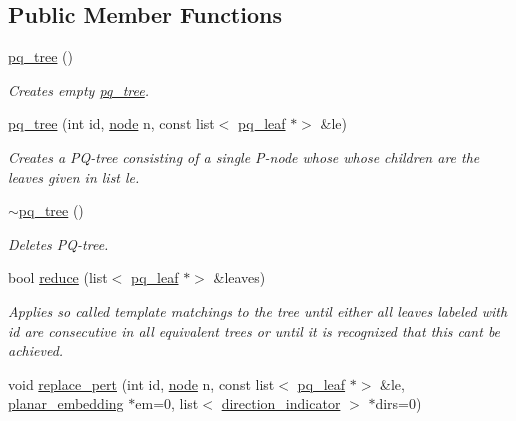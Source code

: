\subsection*{Public Member Functions}
\begin{DoxyCompactItemize}
\item 
\mbox{\label{classpq__tree_afea06921780eb07ddb36294b109964d0}} 
\mbox{\hyperlink{classpq__tree_afea06921780eb07ddb36294b109964d0}{pq\+\_\+tree}} ()
\begin{DoxyCompactList}\small\item\em Creates empty \mbox{\hyperlink{classpq__tree}{pq\+\_\+tree}}. \end{DoxyCompactList}\item 
\mbox{\hyperlink{classpq__tree_a2929a77b0e62274989884fd63db7fbe1}{pq\+\_\+tree}} (int id, \mbox{\hyperlink{classnode}{node}} n, const list$<$ \mbox{\hyperlink{classpq__leaf}{pq\+\_\+leaf}} $\ast$$>$ \&le)
\begin{DoxyCompactList}\small\item\em Creates a P\+Q-\/tree consisting of a single P-\/node whose whose children are the leaves given in list {\ttfamily le}. \end{DoxyCompactList}\item 
\mbox{\label{classpq__tree_ae6b44b3a6db8914beb368aee2bf7cc92}} 
\mbox{\hyperlink{classpq__tree_ae6b44b3a6db8914beb368aee2bf7cc92}{$\sim$pq\+\_\+tree}} ()
\begin{DoxyCompactList}\small\item\em Deletes P\+Q-\/tree. \end{DoxyCompactList}\item 
bool \mbox{\hyperlink{classpq__tree_a89b995f33c70db329b5e0cdd2ebe12b0}{reduce}} (list$<$ \mbox{\hyperlink{classpq__leaf}{pq\+\_\+leaf}} $\ast$$>$ \&leaves)
\begin{DoxyCompactList}\small\item\em Applies so called template matchings to the tree until either all leaves labeled with {\ttfamily id} are consecutive in all equivalent trees or until it is recognized that this can\textquotesingle{}t be achieved. \end{DoxyCompactList}\item 
void \mbox{\hyperlink{classpq__tree_ae201bdcb7bb1d53f36685c7c35b8d9dd}{replace\+\_\+pert}} (int id, \mbox{\hyperlink{classnode}{node}} n, const list$<$ \mbox{\hyperlink{classpq__leaf}{pq\+\_\+leaf}} $\ast$$>$ \&le, \mbox{\hyperlink{classplanar__embedding}{planar\+\_\+embedding}} $\ast$em=0, list$<$ \mbox{\hyperlink{classdirection__indicator}{direction\+\_\+indicator}} $>$ $\ast$dirs=0)
$$
\end{DoxyCompactItemize}
